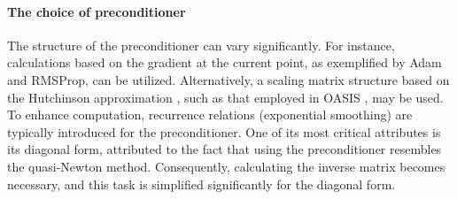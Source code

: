 \documentclass[sn-mathphys,Numbered]{sn-jnl}%
\renewcommand{\|}{\parallel}
\renewcommand {\*} {\ast}
\begin{document}



\paragraph{The choice of preconditioner}

The structure of the preconditioner can vary significantly. For instance, calculations based on the gradient at the current point, as exemplified by Adam and RMSProp, can be utilized. Alternatively, a scaling matrix structure based on the Hutchinson approximation \cite{bekas2007estimator,sadiev2024stochastic}, such as that employed in OASIS \cite{jahani2021doubly}, may be used. To enhance computation, recurrence relations (exponential smoothing) are typically introduced for the preconditioner. One of its most critical attributes is its diagonal form, attributed to the fact that using the preconditioner resembles the quasi-Newton \cite{dennis1977quasi, fletcher2013practical} method. Consequently, calculating the inverse matrix becomes necessary, and this task is simplified significantly for the diagonal form.
\end{document}
